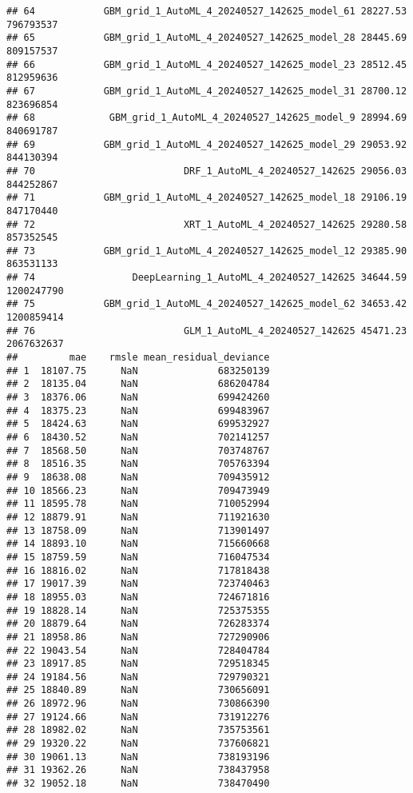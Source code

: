 \documentclass[
]{article}
\begin{document}
\begin{verbatim}
## 64            GBM_grid_1_AutoML_4_20240527_142625_model_61 28227.53  796793537
## 65            GBM_grid_1_AutoML_4_20240527_142625_model_28 28445.69  809157537
## 66            GBM_grid_1_AutoML_4_20240527_142625_model_23 28512.45  812959636
## 67            GBM_grid_1_AutoML_4_20240527_142625_model_31 28700.12  823696854
## 68             GBM_grid_1_AutoML_4_20240527_142625_model_9 28994.69  840691787
## 69            GBM_grid_1_AutoML_4_20240527_142625_model_29 29053.92  844130394
## 70                          DRF_1_AutoML_4_20240527_142625 29056.03  844252867
## 71            GBM_grid_1_AutoML_4_20240527_142625_model_18 29106.19  847170440
## 72                          XRT_1_AutoML_4_20240527_142625 29280.58  857352545
## 73            GBM_grid_1_AutoML_4_20240527_142625_model_12 29385.90  863531133
## 74                 DeepLearning_1_AutoML_4_20240527_142625 34644.59 1200247790
## 75            GBM_grid_1_AutoML_4_20240527_142625_model_62 34653.42 1200859414
## 76                          GLM_1_AutoML_4_20240527_142625 45471.23 2067632637
##         mae    rmsle mean_residual_deviance
## 1  18107.75      NaN              683250139
## 2  18135.04      NaN              686204784
## 3  18376.06      NaN              699424260
## 4  18375.23      NaN              699483967
## 5  18424.63      NaN              699532927
## 6  18430.52      NaN              702141257
## 7  18568.50      NaN              703748767
## 8  18516.35      NaN              705763394
## 9  18638.08      NaN              709435912
## 10 18566.23      NaN              709473949
## 11 18595.78      NaN              710052994
## 12 18879.91      NaN              711921630
## 13 18758.09      NaN              713901497
## 14 18893.10      NaN              715660668
## 15 18759.59      NaN              716047534
## 16 18816.02      NaN              717818438
## 17 19017.39      NaN              723740463
## 18 18955.03      NaN              724671816
## 19 18828.14      NaN              725375355
## 20 18879.64      NaN              726283374
## 21 18958.86      NaN              727290906
## 22 19043.54      NaN              728404784
## 23 18917.85      NaN              729518345
## 24 19184.56      NaN              729790321
## 25 18840.89      NaN              730656091
## 26 18972.96      NaN              730866390
## 27 19124.66      NaN              731912276
## 28 18982.02      NaN              735753561
## 29 19320.22      NaN              737606821
## 30 19061.13      NaN              738193196
## 31 19362.26      NaN              738437958
## 32 19052.18      NaN              738470490

\end{verbatim}
\end{document}
